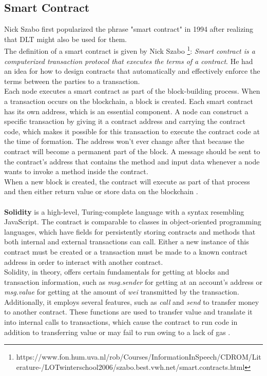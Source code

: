 \subsection{Smart Contract}
Nick Szabo \cite{Szabo} first popularized the phrase "smart contract" in 1994 after realizing that DLT might also be used for them. \\
The definition of a smart contract is given by Nick Szabo \footnote{https://www.fon.hum.uva.nl/rob/Courses/InformationInSpeech/CDROM/Literature-\break /LOTwinterschool2006/szabo.best.vwh.net/smart.contracts.html}: \textit{Smart contract is a computerized transaction protocol that executes the terms of a contract}. He had an idea for how to design contracts that automatically and effectively enforce the terms between the parties to a transaction. \\
Each node executes a smart contract as part of the block-building process. When a transaction occurs on the blockchain, a block is created.
Each smart contract has its own address, which is an essential component. A node can construct a specific transaction by giving it a contract address and carrying the contract code, which makes it possible for this transaction to execute the contract code at the time of formation.
The address won't ever change after that because the contract will become a permanent part of the block. A message should be sent to the contract's address that contains the method and input data whenever a node wants to invoke a method inside the contract. \\
When a new block is created, the contract will execute as part of that process and then either return value or store data on the blockchain \cite{Payrott}.\\
\\
\textbf{Solidity} is a high-level, Turing-complete language with a syntax resembling JavaScript. The contract is comparable to classes in object-oriented programming languages, which have fields for persistently storing contracts and methods that both internal and external transactions can call. Either a new instance of this contract must be created or a transaction must be made to a known contract address in order to interact with another contract.\\
Solidity, in theory, offers certain fundamentals for getting at blocks and transaction information, such as \textit{msg.sender} for getting at an account's address or \textit{msg.value} for getting at the amount of \textit{wei} transmitted by the transaction. Additionally, it employs several features, such as \textit{call} and \textit{send} to transfer money to another contract. These functions are used to transfer value and translate it into internal calls to transactions, which cause the contract to run code in addition to transferring value or may fail to run owing to a lack of gas \cite{Ilya}.